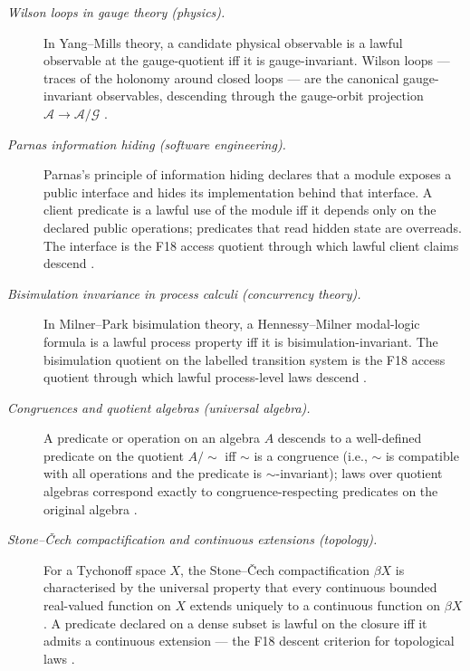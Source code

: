 \documentclass[11pt]{article}
\theoremstyle{definition}
\begin{document}
\begin{description}
\item[\emph{Wilson loops in gauge theory (physics).}]
In Yang--Mills theory, a candidate physical observable is a
lawful observable at the gauge-quotient iff it is
gauge-invariant.  Wilson loops --- traces of the holonomy around
closed loops --- are the canonical gauge-invariant
observables, descending through the gauge-orbit projection
\(\mathcal A\to\mathcal A/\mathcal G\)
\citep{Wilson1974ConfinementQuarks}.

\item[\emph{Parnas information hiding (software engineering).}]
Parnas's principle of information hiding declares that a module
exposes a public interface and hides its implementation behind
that interface.  A client predicate is a lawful use of the
module iff it depends only on the declared public operations;
predicates that read hidden state are overreads.  The interface
is the F18 access quotient through which lawful client claims
descend
\citep{Parnas1972InformationHiding}.

\item[\emph{Bisimulation invariance in process calculi
(concurrency theory).}]
In Milner--Park bisimulation theory, a Hennessy--Milner
modal-logic formula is a lawful process property iff it is
bisimulation-invariant.  The bisimulation quotient on the
labelled transition system is the F18 access quotient through
which lawful process-level laws descend
\citep{Milner1989CommunicationConcurrency}.

\item[\emph{Congruences and quotient algebras (universal
algebra).}]
A predicate or operation on an algebra \(A\) descends to a
well-defined predicate on the quotient \(A/{\sim}\) iff
\(\sim\) is a congruence (i.e., \(\sim\) is compatible with all
operations and the predicate is \(\sim\)-invariant); laws over
quotient algebras correspond exactly to congruence-respecting
predicates on the original algebra
\citep{Gratzer1979UniversalAlgebra}.

\item[\emph{Stone--{\v C}ech compactification and continuous
extensions (topology).}]
For a Tychonoff space \(X\), the Stone--{\v C}ech
compactification \(\beta X\) is characterised by the universal
property that every continuous bounded real-valued function on
\(X\) extends uniquely to a continuous function on \(\beta X\).
A predicate declared on a dense subset is lawful on the closure
iff it admits a continuous extension --- the F18 descent
criterion for topological laws
\citep{Cech1937BicompactSpaces}.
\end{description}
\end{document}
